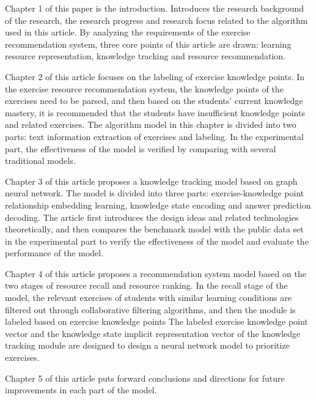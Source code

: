 Chapter 1 of this paper is the introduction. Introduces the research background of the research, the research progress and research focus related to the algorithm used in this article. By analyzing the requirements of the exercise recommendation system, three core points of this article are drawn: learning resource representation, knowledge tracking and resource recommendation.

Chapter 2 of this article focuses on the labeling of exercise knowledge points. In the exercise resource recommendation system, the knowledge points of the exercises need to be parsed, and then based on the students' current knowledge mastery, it is recommended that the students have insufficient knowledge points and related exercises. The algorithm model in this chapter is divided into two parts: text information extraction of exercises and labeling. In the experimental part, the effectiveness of the model is verified by comparing with several traditional models.

Chapter 3 of this article proposes a knowledge tracking model based on graph neural network. The model is divided into three parts: exercise-knowledge point relationship embedding learning, knowledge state encoding and answer prediction decoding. The article first introduces the design ideas and related technologies theoretically, and then compares the benchmark model with the public data set in the experimental part to verify the effectiveness of the model and evaluate the performance of the model.

Chapter 4 of this article proposes a recommendation system model based on the two stages of resource recall and resource ranking. In the recall stage of the model, the relevant exercises of students with similar learning conditions are filtered out through collaborative filtering algorithms, and then the module is labeled based on exercise knowledge points The labeled exercise knowledge point vector and the knowledge state implicit representation vector of the knowledge tracking module are designed to design a neural network model to prioritize exercises.

Chapter 5 of this article puts forward conclusions and directions for future improvements in each part of the model.

